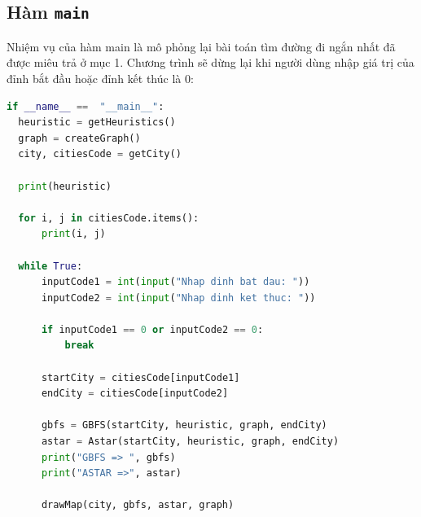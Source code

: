 \documentclass[a4paper, 11pt]{article}
\begin{document}
\subsection{Hàm \lstinline|main|}
Nhiệm vụ của hàm main là mô phỏng lại bài toán tìm đường đi ngắn nhất đã được miêu trả ở mục 1. Chương trình sẽ dừng lại khi người dùng nhập giá trị của đỉnh bắt đầu hoặc đỉnh kết thúc là 0:
\begin{lstlisting}[language=Python]
if __name__ ==  "__main__":
  heuristic = getHeuristics()
  graph = createGraph()
  city, citiesCode = getCity()

  print(heuristic)

  for i, j in citiesCode.items():
      print(i, j)
      
  while True:
      inputCode1 = int(input("Nhap dinh bat dau: "))
      inputCode2 = int(input("Nhap dinh ket thuc: "))

      if inputCode1 == 0 or inputCode2 == 0:
          break

      startCity = citiesCode[inputCode1]
      endCity = citiesCode[inputCode2]

      gbfs = GBFS(startCity, heuristic, graph, endCity)
      astar = Astar(startCity, heuristic, graph, endCity)
      print("GBFS => ", gbfs)
      print("ASTAR =>", astar)

      drawMap(city, gbfs, astar, graph)
\end{lstlisting}
\end{document}
